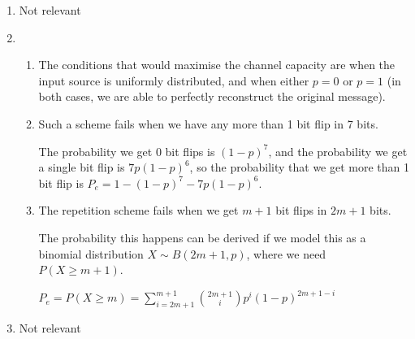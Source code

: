


\begin{enumerate}[label=(\alph*)]
  \item
    Not relevant
  \item
    \begin{enumerate}[label=(\roman*)]
      \item

        The conditions that would maximise the channel capacity are when the input source is uniformly distributed, and when either $p=0$ or $p=1$ (in both cases, we are able to perfectly reconstruct the original message).

      \item
        Such a scheme fails when we have any more than 1 bit flip in 7 bits.

        The probability we get 0 bit flips is $(1-p)^7$, and the probability we get a single bit flip is $7p(1-p)^6$, so the probability that we get more than 1 bit flip is $P_e = 1 - (1-p)^7 - 7p(1-p)^6$.

      \item
        The repetition scheme fails when we get $m+1$ bit flips in $2m+1$ bits.

        The probability this happens can be derived if we model this as a binomial distribution $X \sim B(2m+1, p)$, where we need $P(X \geq m+1)$.

        $P_e = P(X \geq m) = \sum_{i=2m+1}^{m+1} \binom{2m+1}{i} p^i(1-p)^{2m+1-i}$
        
    \end{enumerate}

  \item
    Not relevant
        
    \end{enumerate}

